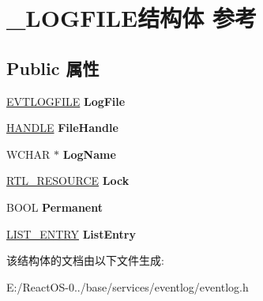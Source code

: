\hypertarget{struct___l_o_g_f_i_l_e}{}\section{\+\_\+\+L\+O\+G\+F\+I\+L\+E结构体 参考}
\label{struct___l_o_g_f_i_l_e}
\subsection*{Public 属性}
\begin{DoxyCompactItemize}
\item 
\mbox{\label{struct___l_o_g_f_i_l_e_a429aab6e326a7b697e505669d20cb24e}} 
\hyperlink{struct___e_v_t_l_o_g_f_i_l_e}{E\+V\+T\+L\+O\+G\+F\+I\+LE} {\bfseries Log\+File}
\item 
\mbox{\label{struct___l_o_g_f_i_l_e_aabf63dafa587353fad071d52203ed513}} 
\hyperlink{interfacevoid}{H\+A\+N\+D\+LE} {\bfseries File\+Handle}
\item 
\mbox{\label{struct___l_o_g_f_i_l_e_ab74958023bea858efc4d5cb9ed11768d}} 
W\+C\+H\+AR $\ast$ {\bfseries Log\+Name}
\item 
\mbox{\label{struct___l_o_g_f_i_l_e_a34c2b2e913f9902bb70c095f314b02bc}} 
\hyperlink{struct___r_t_l___r_e_s_o_u_r_c_e}{R\+T\+L\+\_\+\+R\+E\+S\+O\+U\+R\+CE} {\bfseries Lock}
\item 
\mbox{\label{struct___l_o_g_f_i_l_e_a791bd962df74b1bb4ab024ae11c4155d}} 
B\+O\+OL {\bfseries Permanent}
\item 
\mbox{\label{struct___l_o_g_f_i_l_e_a4c5b9c8cfb58f918ebc98cf443931799}} 
\hyperlink{struct___l_i_s_t___e_n_t_r_y}{L\+I\+S\+T\+\_\+\+E\+N\+T\+RY} {\bfseries List\+Entry}
\end{DoxyCompactItemize}


该结构体的文档由以下文件生成\+:\begin{DoxyCompactItemize}
\item 
E\+:/\+React\+O\+S-\/0../base/services/eventlog/eventlog.\+h\end{DoxyCompactItemize}
